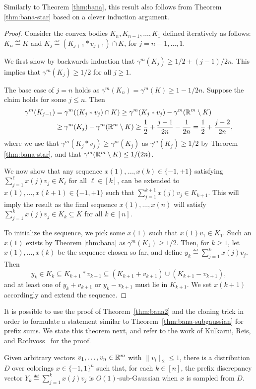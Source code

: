 Similarly to Theorem \ref{thm:bana}, this result also follows from Theorem \ref{thm:bana-star} based on a clever induction argument.  
\begin{proof}
Consider the convex bodies $K_n,K_{n-1},\ldots,K_1$ defined
iteratively as follows:  $K_n\eqdef K$ and $K_{j}\eqdef(K_{j+1}*v_{j+1}) \cap K$, for $j=n-1,\ldots,1$.  

We first show by backwards induction that $\gamma^m(K_j) \geq 1/2 + (j-1)/2n$. This implies that $\gamma^m(K_j) \geq 1/2$ for all $j\geq 1$.

The base case of $j=n$ holds as $\gamma^m(K_n) = \gamma^m(K) \ge 1-1/2n$.
Suppose the claim holds for some $j \leq n$. Then 
\begin{align*}\gamma^{m}(K_{j-1}) &  = \gamma^m((K_{j}*v_{j}) \cap
                                      K) \geq  \gamma^m(K_{j}*v_{j}) - \gamma^m(\mathbb{R}^m\setminus {K}) \\
& \geq    \gamma^m(K_{j})  - \gamma^m(\mathbb{R}^m\setminus{K}) \geq  \frac{1}{2} +\frac{j-1}{2n} -\frac{1}{2n} = \frac{1}{2} + \frac{ j-2}{2n},
\end{align*}
where we use that $\gamma^m(K_{j}*v_{j}) \geq \gamma^m(K_{j})$ as
$\gamma^m(K_{j}) \geq 1/2$ by Theorem \ref{thm:bana-star}, and that
$\gamma^m(\mathbb{R}^m \setminus {K})\leq 1/(2n)$.

We now show that any sequence $x(1), \ldots, x(k) \in \{-1,+1\}$ satisfying
$\sum_{j=1}^\ell x(j) v_j \in K_\ell$ for all $\ell \in [k]$, can be extended to
$x(1), \ldots, x(k+1) \in \{-1,+1\}$ such that $\sum_{j=1}^{k+1} x(j)
v_j \in K_{k+1}$. This will imply the result as the final sequence
$x(1),\ldots,x(n)$ will satisfy $\sum_{j=1}^k x(j) v_j \in K_k
\subseteq K$ for all $k\in [n]$.

To initialize the sequence, we pick some $x(1)$ such that $x(1) v_1 \in K_1$. Such an $x(1)$ exists by Theorem \ref{thm:bana} as $\gamma^m(K_1) \geq 1/2$. 
Then, for $k\ge 1$, let $x(1),\ldots,x(k)$ be the sequence chosen so
far, and define $y_k\eqdef\sum_{j=1}^k x(j) v_j$.  Then
\[y_k\in K_k \subseteq K_{k+1}*v_{k+1} \subseteq (K_{k+1}+v_{k+1}) \cup
  (K_{k+1}- v_{k+1}),\] and at least one of $y_k+v_{k+1}$ or $y_k-v_{k+1}$ must lie in $K_{k+1}$. We set $x(k+1)$ accordingly and extend the sequence.
\end{proof}

It is possible to use the proof of Theorem~\ref{thm:bana2} and the
cloning trick in order to formulate a statement similar to
Theorem~\ref{thm:bana-subgaussian} for prefix sums. We state this
theorem next, and refer to the work of Kulkarni, Reis, and Rothvoss~\cite{rothvoss-online} for the
proof.
\begin{theorem}\label{thm:bana-prefix-subgaussian}
  Given arbitrary vectors $v_1,\ldots,v_n \in \mathbb{R}^m$ with $\|v_i\|_2
  \leq 1$, there is a distribution $D$ over colorings $x \in
  \{-1,1\}^n$ such that, for each $k \in [n]$, the prefix discrepancy
  vector $Y_k \eqdef \sum_{j=1}^k x(j) v_j$ is $O(1)$-sub-Gaussian when
  $x$ is sampled from $D$.
\end{theorem}

